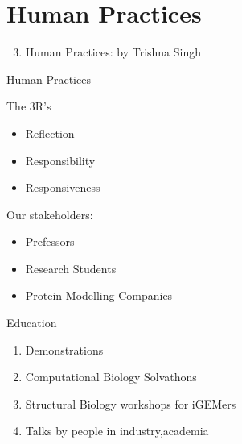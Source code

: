 \section*{Human Practices}

\begin{frame}
    \begin{enumerate}
        \setcounter{enumi}{2}
        \item Human Practices: by Trishna Singh
    \end{enumerate}
\end{frame}

\begin{frame}{Human Practices}
    \begin{block}{The 3R's}
        \begin{itemize}
            \item Reflection
            \item Responsibility
            \item Responsiveness
        \end{itemize}
    \end{block}

    Our stakeholders:
    \begin{itemize}
        \item Prefessors
        \item Research Students
        \item Protein Modelling Companies
    \end{itemize}
\end{frame}

\begin{frame}{Education}
    \begin{enumerate}
        \item Demonstrations
        \item Computational Biology Solvathons
        \item Structural Biology workshops for iGEMers
        \item Talks by people in industry,academia
    \end{enumerate}    
\end{frame}

